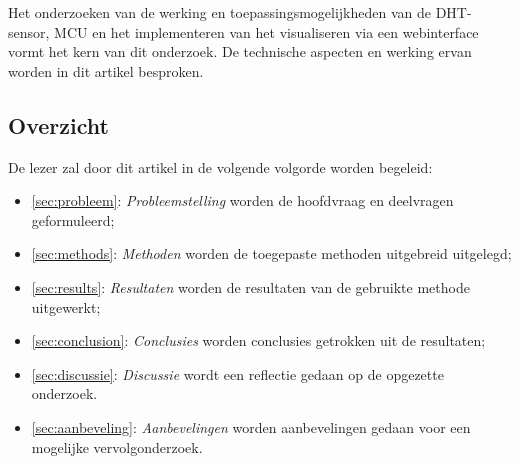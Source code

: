 Het onderzoeken van de werking  en toepassingsmogelijkheden van de DHT-sensor, MCU en het implementeren van het visualiseren via een webinterface vormt het kern van dit onderzoek. 
De technische aspecten en werking ervan worden in dit artikel besproken. 
\subsection{Overzicht}
De lezer zal door dit artikel in de volgende volgorde worden begeleid:
\begin{itemize}
    \item[\ding{226}]\autoref{sec:probleem}: \textit{Probleemstelling} worden de hoofdvraag en deelvragen geformuleerd;
    \item[\ding{226}]\autoref{sec:methods}: \textit{Methoden} worden de toegepaste methoden uitgebreid uitgelegd;
    \item[\ding{226}]\autoref{sec:results}: \textit{Resultaten} worden de resultaten van de gebruikte methode uitgewerkt;
    \item[\ding{226}]\autoref{sec:conclusion}: \textit{Conclusies} worden conclusies getrokken uit de resultaten;
    \item[\ding{226}]\autoref{sec:discussie}: \textit{Discussie} wordt een reflectie gedaan op de opgezette onderzoek.
    \item[\ding{226}]\autoref{sec:aanbeveling}: \textit{Aanbevelingen} worden aanbevelingen gedaan voor een mogelijke vervolgonderzoek.
\end{itemize}